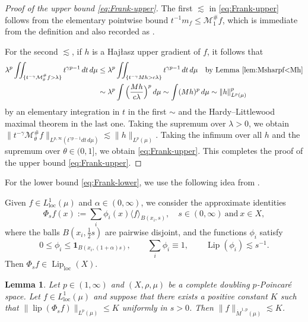 \documentclass[11pt]{amsart}
\newtheorem{lemma}[theorem]{Lemma}
\theoremstyle{definition}
\theoremstyle{remark}
\numberwithin{equation}{section}
\newcommand{\ave}[1]{\langle #1\rangle}
\newcommand{\Norm}[2]{\|#1\|_{#2}}
\begin{document}
\begin{proof}[Proof of the upper bound \eqref{eq:Frank-upper}]
The first $\lesssim$ in \eqref{eq:Frank-upper} follows from the elementary pointwise bound
$t^{-1}m_f\leq\mathcal M_1^{\#}f$, which is immediate from the definition and also recorded
as \cite[(2.13)]{DLYYZ}.

For the second $\lesssim$, if $h$ is a Haj\l{}asz upper gradient of $f$, it follows that
\begin{equation*}
\begin{split}
   \lambda^p\iint_{\{t^{-\gamma}\mathcal M_\theta^{\#}f>\lambda\}}t^{\gamma p-1}\,dt\,d\mu
   &\leq \lambda^p\iint_{\{t^{-\gamma}Mh>c\lambda\}}t^{\gamma p-1}\,dt\,d\mu
   \quad\text{by Lemma \ref{lem:Msharpf<Mh}} \\
   &\sim\lambda^p\int\Big(\frac{Mh}{c\lambda}\Big)^p\, d\mu
   \sim\int (Mh)^p\,d\mu\sim\Norm{h}{L^p(\mu)}^p
\end{split}
\end{equation*}
by an elementary integration in $t$ in the first $\sim$ and the Hardy--Littlewood maximal
theorem in the last one. Taking the supremum over $\lambda>0$, we obtain $\Norm{ t^{-\gamma}
\mathcal M_\theta^{\#} f
 }{ L^{p,\infty}(t^{\gamma p-1}dt\,d\mu)}
\lesssim\Norm{h}{L^p(\mu)}$. Taking the infimum over all $h$ and the supremum over
$\theta\in(0,1]$, we obtain \eqref{eq:Frank-upper}.
This completes the proof of the upper bound \eqref{eq:Frank-upper}.
\end{proof}

For the lower bound \eqref{eq:Frank-lower}, we use the following idea from \cite{HK:W1p}.

Given $f\in L^1_{\mathrm{loc}}(\mu)$ and $\alpha\in (0,\infty)$,
we consider the approximate identities \cite[(3.2)]{HK:W1p}
\begin{equation}
\Phi_s f(x):=\sum_i \phi_i(x)\ave{f}_{B(x_i,s)}, \quad s\in(0,\infty)\ \text{and}\ x\in X,
\end{equation}
where the balls $B(x_i,\frac12 s)$ are pairwise disjoint, and the functions $\phi_i$ satisfy
\begin{equation*}
  0\leq\phi_i\leq \mathbf{1}_{B(x_i,(1+\alpha)s)},\qquad
  \sum_i\phi_i\equiv 1,\qquad
  \operatorname{Lip}(\phi_i)\lesssim s^{-1}.
\end{equation*}
Then $\Phi_s f\in\operatorname{Lip}_\mathrm{loc}(X)$.

\begin{lemma}\label{lem:lip(Phis)<K}
Let $p\in(1,\infty)$ and $(X,\rho,\mu)$ be a complete doubling
$p$-Poincar\'e space. Let $f\in L^1_{\mathrm{loc}}(\mu)$ and suppose that
there exists a positive constant $K$ such that $\Norm{\operatorname{lip}(\Phi_s
f)}{L^p(\mu)}\leq K$ uniformly in $s>0$. Then $\Norm{f}{\dot M^{1,p}(\mu)}\lesssim K$.
\end{lemma}
\end{document}
